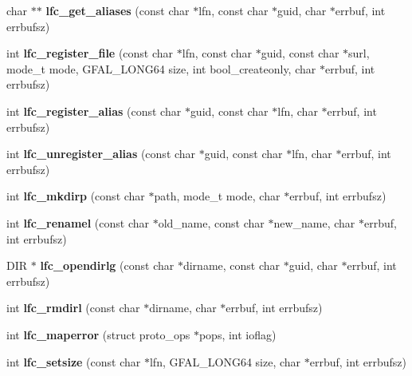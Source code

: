 \begin{CompactItemize}
\item 
char $\ast$$\ast$ \textbf{lfc\_\-get\_\-aliases} (const char $\ast$lfn, const char $\ast$guid, char $\ast$errbuf, int errbufsz)\label{group__lowlevel_g546944558296f5a894005368c236cccf}

\item 
int \textbf{lfc\_\-register\_\-file} (const char $\ast$lfn, const char $\ast$guid, const char $\ast$surl, mode\_\-t mode, GFAL\_\-LONG64 size, int bool\_\-createonly, char $\ast$errbuf, int errbufsz)\label{group__lowlevel_gdc3db49fb133cc79ae3250731167b478}

\item 
int \textbf{lfc\_\-register\_\-alias} (const char $\ast$guid, const char $\ast$lfn, char $\ast$errbuf, int errbufsz)\label{group__lowlevel_gbcf2a1618d925816f8b570cdeac04afd}

\item 
int \textbf{lfc\_\-unregister\_\-alias} (const char $\ast$guid, const char $\ast$lfn, char $\ast$errbuf, int errbufsz)\label{group__lowlevel_g776fc6004cd4c565c42be3365a719376}

\item 
int \textbf{lfc\_\-mkdirp} (const char $\ast$path, mode\_\-t mode, char $\ast$errbuf, int errbufsz)\label{group__lowlevel_gb13d4fafbe48d4748371fb2780381908}

\item 
int \textbf{lfc\_\-renamel} (const char $\ast$old\_\-name, const char $\ast$new\_\-name, char $\ast$errbuf, int errbufsz)\label{group__lowlevel_gf0a92088b3b2bd149ad3968573d3dbce}

\item 
DIR $\ast$ \textbf{lfc\_\-opendirlg} (const char $\ast$dirname, const char $\ast$guid, char $\ast$errbuf, int errbufsz)\label{group__lowlevel_ge22436958fd4ad2bb2bcc1b608aa7f34}

\item 
int \textbf{lfc\_\-rmdirl} (const char $\ast$dirname, char $\ast$errbuf, int errbufsz)\label{group__lowlevel_ga46361de52e13b63a74c50589a75fa33}

\item 
int \textbf{lfc\_\-maperror} (struct proto\_\-ops $\ast$pops, int ioflag)\label{group__lowlevel_g6be41de8da5424cc099b88ec27f772c0}

\item 
int \textbf{lfc\_\-setsize} (const char $\ast$lfn, GFAL\_\-LONG64 size, char $\ast$errbuf, int errbufsz)\label{group__lowlevel_g30eee0fb314a09f9b28cddd249ccf692}


\end{CompactItemize}
